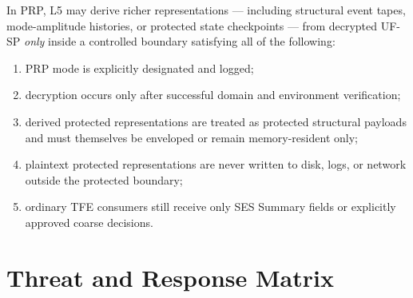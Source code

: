 In PRP, L5 may derive richer representations --- including structural event tapes, mode-amplitude histories, or protected state checkpoints --- from decrypted UF-SP \emph{only} inside a controlled boundary satisfying all of the following:
\begin{enumerate}[leftmargin=1.2cm]
    \item PRP mode is explicitly designated and logged;
    \item decryption occurs only after successful domain and environment verification;
    \item derived protected representations are treated as protected structural payloads and must themselves be enveloped or remain memory-resident only;
    \item plaintext protected representations are never written to disk, logs, or network outside the protected boundary;
    \item ordinary TFE consumers still receive only SES Summary fields or explicitly approved coarse decisions.
\end{enumerate}

\section{Threat and Response Matrix}

